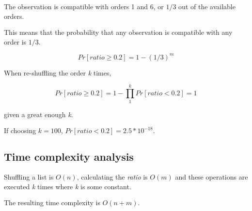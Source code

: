 \documentclass[11pt, a4paper]{article}
\begin{document}
The observation is compatible with orders 1 and 6, or 
$1/3$ out of the available orders. 

This means that the probability that any observation is
compatible with any order is $1/3$.

\[Pr[ratio \ge 0.2] = 1 - (1/3)^m\]

When re-shuffling the order \textit{k} times, 

\[Pr[ratio \ge 0.2] = 1 - \prod_{1}^{k} Pr[ratio < 0.2] = 1\]

given a great enough \textit{k}.

If choosing $k = 100$, $Pr[ratio < 0.2] = 2.5*10^{-18}$.

\subsection{Time complexity analysis}

Shuffling a list is $O(n)$, 
calculating the \textit{ratio} is $O(m)$ and
these operations are executed \textit{k} times where \textit{k} is some constant.

\vspace{1mm}
The resulting time complexity is $O(n+m)$.
\end{document}
